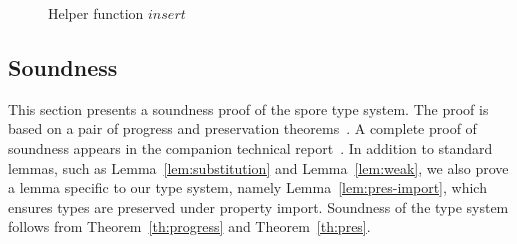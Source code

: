 \documentclass[runningheads]{llncs}
\newcommand{\seq}[1]{\overline{#1}}
\begin{document}
\begin{sloppypar}
\begin{figure}[ht!]
\begin{mathpar}


\end{mathpar}
  \vspace{-0.6cm}
  \vspace{-2.5mm}
  \caption{Helper function $insert$}
  \label{fig:helper}
  \vspace{-5mm}
\end{figure}

\subsection{Soundness}\label{sec:soundness}

This section presents a soundness proof of the spore type system. The proof is based on a pair of progress and preservation theorems~\cite{WrightF94}. A complete proof of soundness appears in the companion technical report~\cite{SporesFormally}. In addition to standard lemmas, such as Lemma~\ref{lem:substitution} and Lemma~\ref{lem:weak}, we also prove a lemma specific to our type system, namely Lemma~\ref{lem:pres-import}, which ensures types are preserved under property import. Soundness of the type system follows from Theorem~\ref{th:progress} and Theorem~\ref{th:pres}.






\end{sloppypar}
\end{document}
